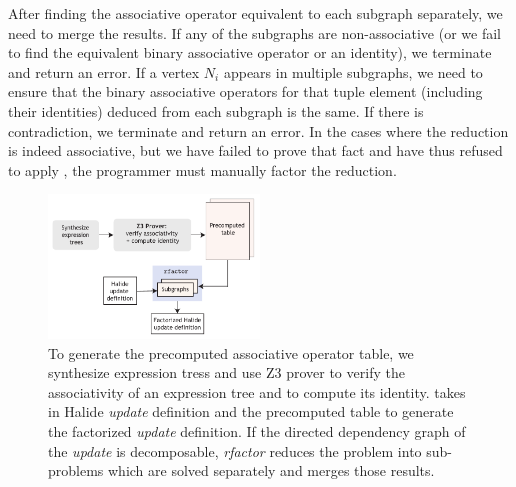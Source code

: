 After finding the associative operator equivalent to each subgraph separately, we need to merge the results. If any of the subgraphs are non-associative (or we fail to find the equivalent binary associative operator or an identity), we terminate and return an error. If a vertex $N_i$ appears in multiple subgraphs, we need to ensure that the binary associative operators for that tuple element (including their identities) deduced from each subgraph is the same. If there is contradiction, we terminate and return an error. In the cases where the reduction is indeed associative, but we have failed to prove that fact and have thus refused to apply , the programmer must manually factor the reduction.

\begin{figure}
\centering
\includegraphics[width=0.5\textwidth]{system}
\caption{To generate the precomputed associative operator table, we synthesize expression tress and use Z3 prover to verify the associativity of an expression tree and to compute its identity.  takes in Halide \emph{update} definition and the precomputed table to generate the factorized \emph{update} definition. If the directed dependency graph of the \emph{update} is decomposable, \emph{rfactor} reduces the problem into sub-problems which are solved separately and merges those results.}
\label{fig:system}
\end{figure}
